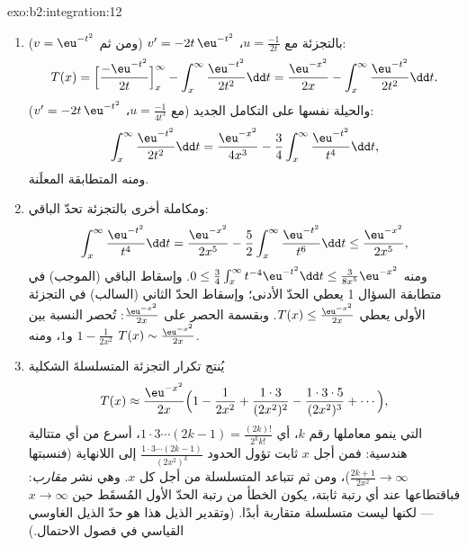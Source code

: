 \begin{solution}{exo:b2:integration:12}
\begin{enumerate}
  \item بالتجزئة مع $u = \frac{-1}{2t}$، $v' = -2t\,\eu^{-t^2}$
        (ومن ثم $v = \eu^{-t^2}$):
        \[
        T(x) = \Bigl[\frac{-\eu^{-t^2}}{2t}\Bigr]_x^\infty
        - \int_x^\infty \frac{\eu^{-t^2}}{2t^2}\dd t
        = \frac{\eu^{-x^2}}{2x}
        - \int_x^\infty \frac{\eu^{-t^2}}{2t^2}\dd t .
        \]
        والحيلة نفسها على التكامل الجديد (مع $u = \frac{-1}{4t^3}$،
        $v' = -2t\,\eu^{-t^2}$):
        \[
        \int_x^\infty \frac{\eu^{-t^2}}{2t^2}\dd t
        = \frac{\eu^{-x^2}}{4x^3}
        - \frac34\int_x^\infty \frac{\eu^{-t^2}}{t^4}\dd t ,
        \]
        ومنه المتطابقة المعلَنة.
  \item ومكاملة أخرى بالتجزئة تحدّ الباقي:
        \[
        \int_x^\infty \frac{\eu^{-t^2}}{t^4}\dd t
        = \frac{\eu^{-x^2}}{2x^5}
        - \frac52\int_x^\infty\frac{\eu^{-t^2}}{t^6}\dd t
        \leq \frac{\eu^{-x^2}}{2x^5},
        \]
        ومنه $0 \leq \frac34\int_x^\infty t^{-4}\eu^{-t^2}\dd t
        \leq \frac{3}{8x^5}\eu^{-x^2}$. وإسقاط الباقي (الموجب)
        في متطابقة السؤال 1 يعطي الحدّ
        الأدنى؛ وإسقاط الحدّ الثاني (السالب) في التجزئة الأولى
        يعطي $T(x) \leq \frac{\eu^{-x^2}}{2x}$. وبقسمة
        الحصر على $\frac{\eu^{-x^2}}{2x}$: تُحصر النسبة
        بين $1 - \frac{1}{2x^2}$ و$1$، ومنه $T(x)
        \sim \frac{\eu^{-x^2}}{2x}$.
  \item يُنتج تكرار التجزئة المتسلسلةَ الشكلية
        \[
        T(x) \approx \frac{\eu^{-x^2}}{2x}\Bigl(1 -
        \frac{1}{2x^2} + \frac{1\cdot3}{(2x^2)^2} -
        \frac{1\cdot3\cdot5}{(2x^2)^3} + \cdots\Bigr),
        \]
        التي ينمو معاملها رقم $k$، أي $1\cdot3\cdots(2k-1) =
        \frac{(2k)!}{2^k k!}$، أسرع من أي متتالية
        هندسية: فمن أجل $x$ ثابت تؤول الحدود
        $\frac{1\cdot3\cdots(2k-1)}{(2x^2)^k}$ إلى اللانهاية
        (فنسبتها $\frac{2k+1}{2x^2} \to \infty$)، ومن ثم تتباعد
        المتسلسلة من أجل كل $x$. وهي نشر \emph{مقارب}:
        فباقتطاعها عند أي رتبة ثابتة، يكون الخطأ من رتبة الحدّ
        الأول المُسقَط حين $x \to \infty$ --- لكنها ليست متسلسلة
        متقاربة أبدًا. (وتقدير الذيل هذا هو حدّ الذيل الغاوسي
        القياسي في فصول الاحتمال.)
\end{enumerate}
\end{solution}

